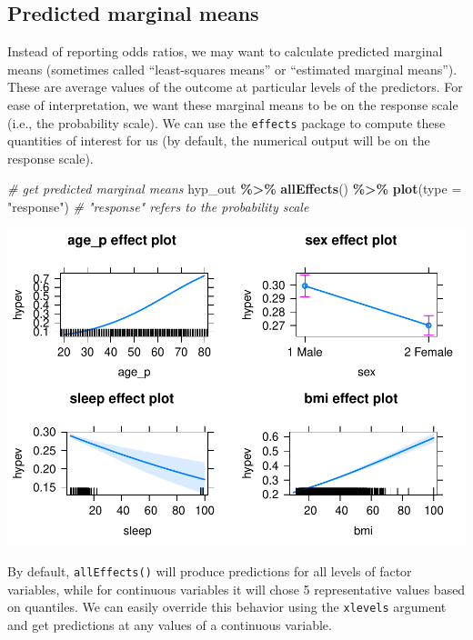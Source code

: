\documentclass[
]{book}
\newenvironment{Shaded}{\begin{snugshade}}{\end{snugshade}}
\newcommand{\CommentTok}[1]{\textcolor[rgb]{0.56,0.35,0.01}{\textit{#1}}}
\newcommand{\DataTypeTok}[1]{\textcolor[rgb]{0.13,0.29,0.53}{#1}}
\newcommand{\KeywordTok}[1]{\textcolor[rgb]{0.13,0.29,0.53}{\textbf{#1}}}
\newcommand{\NormalTok}[1]{#1}
\newcommand{\OperatorTok}[1]{\textcolor[rgb]{0.81,0.36,0.00}{\textbf{#1}}}
\newcommand{\StringTok}[1]{\textcolor[rgb]{0.31,0.60,0.02}{#1}}
\begin{document}
\hypertarget{predicted-marginal-means}{%
\subsection{Predicted marginal means}\label{predicted-marginal-means}}

Instead of reporting odds ratios, we may want to calculate predicted marginal means (sometimes called ``least-squares means'' or ``estimated marginal means''). These are average values of the outcome at particular levels of the predictors. For ease of interpretation, we want these marginal means to be on the response scale (i.e., the probability scale). We can use the \texttt{effects} package to compute these quantities of interest for us (by default, the numerical output will be on the response scale).

\begin{Shaded}
\begin{Highlighting}[]
  \CommentTok{\# get predicted marginal means}
\NormalTok{  hyp\_out }\OperatorTok{\%\textgreater{}\%}\StringTok{ }
\StringTok{      }\KeywordTok{allEffects}\NormalTok{() }\OperatorTok{\%\textgreater{}\%}
\StringTok{      }\KeywordTok{plot}\NormalTok{(}\DataTypeTok{type =} \StringTok{"response"}\NormalTok{) }\CommentTok{\# "response" refers to the probability scale}
\end{Highlighting}
\end{Shaded}

\includegraphics{R/Rmodels/figures/unnamed-chunk-130-1.pdf}

By default, \texttt{allEffects()} will produce predictions for all levels of factor variables, while for continuous variables it will chose 5 representative values based on quantiles. We can easily override this behavior using the \texttt{xlevels} argument and get predictions at any values of a continuous variable.
\end{document}
